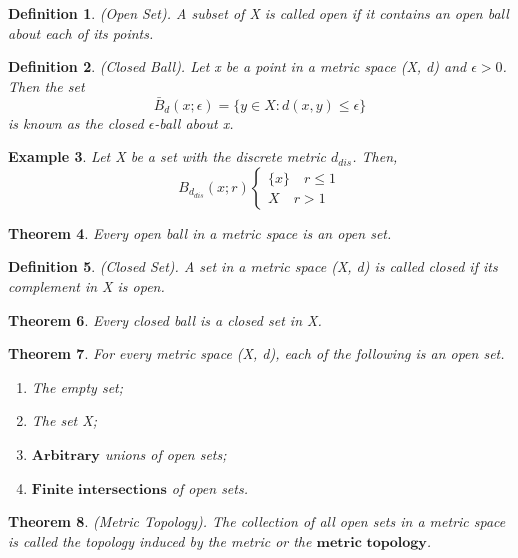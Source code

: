 \documentclass[twoside]{article}
\newcounter{lecnum}
\newtheorem{theorem}{Theorem}[lecnum]
\newtheorem{definition}[theorem]{Definition}
\newtheorem{example}[theorem]{Example}
\begin{document}
\begin{definition}(Open Set). A subset of X is called open if it contains an open ball about each of its points.
\end{definition}

\begin{definition}(Closed Ball). Let x be a point in a metric space (X, d) and $\epsilon > 0$. Then the set
$$
\bar{B}_d(x;\epsilon) = \{y \in X: d(x, y) \leq \epsilon\}
$$
is known as the closed $\epsilon$-ball about x.
\end{definition}

\begin{example}Let X be a set with the discrete metric $d_{dis}$. Then,
\[ B_{d_{dis}}(x;r)\begin{cases}
    \{x\} \quad r \leq 1 \\
    X \quad  r > 1
    \end{cases}
\]
\end{example}

\begin{theorem}Every open ball in a metric space is an open set.
\end{theorem}

\begin{definition}(Closed Set). A set in a metric space (X, d) is called closed if its complement in X is open.
\end{definition}

\begin{theorem}Every closed ball is a closed set in X.
\end{theorem}

\begin{theorem}For every metric space (X, d), each of the following is an open set.
\begin{enumerate}
    \item The empty set;
    \item The set X;
    \item $\textbf{Arbitrary}$ unions of open sets;
    \item $\textbf{Finite intersections}$ of open sets.
\end{enumerate}
\end{theorem}

\begin{theorem}(Metric Topology). The collection of all open sets in a metric space is called the topology induced by the metric or the $\textbf{metric topology}$.
\end{theorem}
\end{document}
